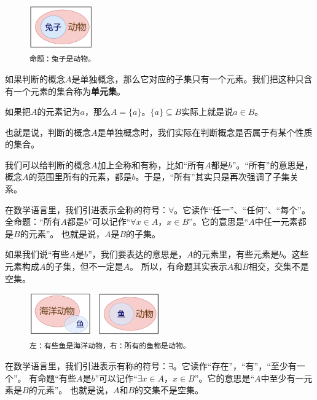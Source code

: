 \documentclass[12pt,UTF8]{ctexbook}
\theoremstyle{definition}
\theoremstyle{plain}
\begin{document}
\begin{figure} %
    \vspace{-32pt}
    \flushright
    \includegraphics[width=0.24\textwidth]{tu/判断和集合1.png}
    \caption*{\texttt{命题：兔子是动物。}}
\end{figure}

如果判断的概念$A$是单独概念，那么它对应的子集只有一个元素。我们把这种只含有一个元素的集合称为\textbf{单元集}。

如果把$A$的元素记为$a$，那么$A = \{a\}$。$\{a\} \subseteq B$实际上就是说$a\in B$。

也就是说，判断的概念$A$是单独概念时，我们实际在判断概念是否属于有某个性质的集合。

我们可以给判断的概念$A$加上全称和有称，比如“所有$A$都是$b$”。“所有”的意思是，
概念$A$的范围里所有的元素，都是$b$。于是，“所有”其实只是再次强调了子集关系。

在数学语言里，我们引进表示全称的符号：$\forall$。它读作“任一”、“任何”、“每个”。
全命题：“所有$A$都是$b$”可以记作“$\forall x \in A$，$x \in B$”。它的意思是“$A$中任一元素都是$B$的元素”。
也就是说，$A$是$B$的子集。

如果我们说“有些$A$是$b$”，我们要表达的意思是，$A$的元素里，有些元素是$b$。这些元素构成$A$的子集，但不一定是$A$。
所以，有命题其实表示$A$和$B$相交，交集不是空集。

\begin{figure}[h]
    \vspace{4pt}
    \centering
    \includegraphics[width=0.5\textwidth]{tu/判断和集合2.png}
    \captionsetup{justification=centering}
    \caption*{\texttt{左：有些鱼是海洋动物，右：所有的鱼都是动物。}}
\end{figure}

在数学语言里，我们引进表示有称的符号：$\exists$。它读作“存在”，“有”，“至少有一个”。
有命题“有些$A$是$b$”可以记作“$\exists x \in A$，$x \in B$”。它的意思是“$A$中至少有一元素是$B$的元素”。
也就是说，$A$和$B$的交集不是空集。
\end{document}
